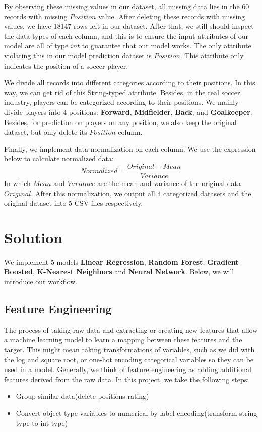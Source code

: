 \documentclass{article}
\begin{document}
\par By observing these missing values in our dataset, all missing data lies in the 60 records with missing $Position$ value. After deleting these records with missing values, we have 18147 rows left in our dataset. After that, we still should inspect the data types of each column, and this is to ensure the input attributes of our model are all of type $int$ to guarantee that our model works. The only attribute violating this in our model prediction dataset is $Position$. This attribute only indicates the position of a soccer player.
\par We divide all records into different categories according to their positions. In this way, we can get rid of this String-typed attribute. Besides, in the real soccer industry, players can be categorized according to their positions. We mainly divide players into 4 positions: \textbf{Forward}, \textbf{Midfielder}, \textbf{Back}, and \textbf{Goalkeeper}. Besides, for prediction on players on any position, we also keep the original dataset, but only delete its $Position$ column.
\par Finally, we implement data normalization on each column. We use the expression below to calculate normalized data:
$$Normalized = \frac{Original-Mean}{Variance}$$
In which $Mean$ and $Variance$ are the mean and variance of the original data $Original$. After this normalization, we output all 4 categorized datasets and the original dataset into 5 CSV files respectively.

\section*{Solution}
We implement 5 models \textbf{Linear Regression}, \textbf{Random Forest}, \textbf{Gradient Boosted}, \textbf{K-Nearest Neighbors} and \textbf{Neural Network}. Below, we will introduce our workflow.

\subsection*{Feature Engineering}
The process of taking raw data and extracting or creating new features that allow a machine learning model to learn a mapping between these features and the target. This might mean taking transformations of variables, such as we did with the log and square root, or one-hot encoding categorical variables so they can be used in a model. Generally, we think of feature engineering as adding additional features derived from the raw data.
In this project, we take the following steps:
\begin{itemize}
    \item Group similar data(delete positions rating)
    \item Convert object type variables to numerical by label encoding(transform string type to int type)
\end{itemize}
\end{document}

